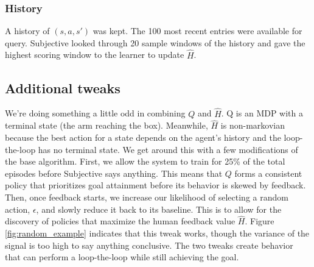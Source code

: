 \documentclass{article}
\begin{document}
\subsubsection{History}

A history of $(s,a,s')$ was kept. The 100 most recent entries were available for query. Subjective looked through 20 sample windows of the history and gave the highest scoring window to the learner to update $\hat{H}$. 

\subsection{Additional tweaks}

We're doing something a little odd in combining $Q$ and $\hat{H}$. Q is an MDP with a terminal state (the arm reaching the box). Meanwhile, $\hat{H}$ is non-markovian because the best action for a state depends on the agent's history and the loop-the-loop has no terminal state. We get around this with a few modifications of the base algorithm. First, we allow the system to train for 25\% of the total episodes before Subjective says anything. This means that $Q$ forms a consistent policy that prioritizes goal attainment before its behavior is skewed by feedback. Then, once feedback starts, we increase our likelihood of selecting a random action, $\epsilon$, and slowly reduce it back to its baseline. This is to allow for the discovery of policies that maximize the human feedback value $\hat{H}$. Figure \ref{fig:random_example} indicates that this tweak works, though the variance of the signal is too high to say anything conclusive. The two tweaks create behavior that can perform a loop-the-loop while still achieving the goal. 
\end{document}
